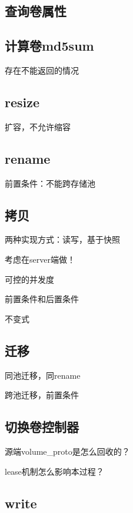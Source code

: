 \subsection{查询卷属性}

\subsection{计算卷md5sum}

存在不能返回的情况

\subsection{resize}

扩容，不允许缩容

\subsection{rename}

前置条件：不能跨存储池

\subsection{拷贝}

两种实现方式：读写，基于快照

考虑在server端做！

可控的并发度

前置条件和后置条件

不变式

\subsection{迁移}

同池迁移，同rename

跨池迁移，前置条件

\subsection{切换卷控制器}

\begin{compactenum}
\item 源端volume\_proto是怎么回收的？
\item lease机制怎么影响本过程？
\end{compactenum}

\subsection{write}


